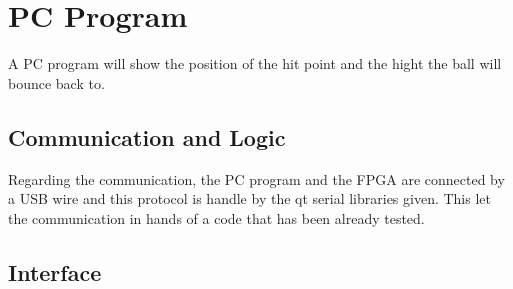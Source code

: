 \chapter{PC Program}
\label{chap:pc_program}
A PC program will show the position of the hit point and the hight the ball will bounce back to.

\section{Communication and Logic}
\label{sec:pc_program_com}
Regarding the communication, the PC program and the FPGA are connected by a USB wire and this protocol is handle by the qt serial libraries given. This let the communication in hands of a code that has been already tested.
 

\section{Interface}
\label{sec:pc_program_interface}
